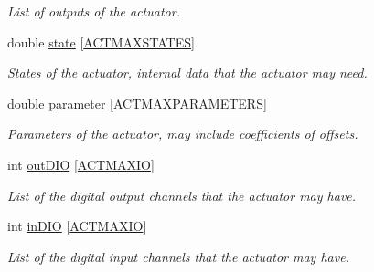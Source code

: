 \begin{DoxyCompactItemize}
\begin{DoxyCompactList}\small\item\em List of outputs of the actuator. \end{DoxyCompactList}\item 
\mbox{\label{struct_actuator___afca7e24efcad4fc760ab8d4a700df973}} 
double \hyperlink{struct_actuator___afca7e24efcad4fc760ab8d4a700df973}{state} \mbox{[}\hyperlink{_actuator_8h_aa4b689fdf6fed3db04789f692cb26d62}{A\+C\+T\+M\+A\+X\+S\+T\+A\+T\+ES}\mbox{]}
\begin{DoxyCompactList}\small\item\em States of the actuator, internal data that the actuator may need. \end{DoxyCompactList}\item 
\mbox{\label{struct_actuator___a0458086d5d3f6c5282c6c4e033054c08}} 
double \hyperlink{struct_actuator___a0458086d5d3f6c5282c6c4e033054c08}{parameter} \mbox{[}\hyperlink{_actuator_8h_ac0b3df9afc41a8edeb402e6da4c50155}{A\+C\+T\+M\+A\+X\+P\+A\+R\+A\+M\+E\+T\+E\+RS}\mbox{]}
\begin{DoxyCompactList}\small\item\em Parameters of the actuator, may include coefficients of offsets. \end{DoxyCompactList}\item 
\mbox{\label{struct_actuator___a9aa4aa63f1f31c903fab3fcf4c41de35}} 
int \hyperlink{struct_actuator___a9aa4aa63f1f31c903fab3fcf4c41de35}{out\+D\+IO} \mbox{[}\hyperlink{_actuator_8h_a124e6cd28aabeb095341daaabdef7363}{A\+C\+T\+M\+A\+X\+IO}\mbox{]}
\begin{DoxyCompactList}\small\item\em List of the digital output channels that the actuator may have. \end{DoxyCompactList}\item 
\mbox{\label{struct_actuator___a39e8efa83828a9673fbbb3e3956ae264}} 
int \hyperlink{struct_actuator___a39e8efa83828a9673fbbb3e3956ae264}{in\+D\+IO} \mbox{[}\hyperlink{_actuator_8h_a124e6cd28aabeb095341daaabdef7363}{A\+C\+T\+M\+A\+X\+IO}\mbox{]}
\begin{DoxyCompactList}\small\item\em List of the digital input channels that the actuator may have. \end{DoxyCompactList}\item 

\end{DoxyCompactItemize}
